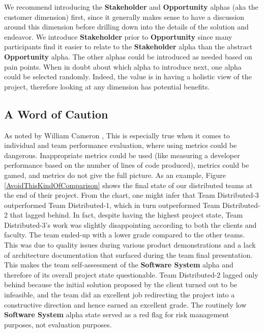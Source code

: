 We recommend introducing the \textbf{Stakeholder} and \textbf{Opportunity} alphas (aka the customer dimension) first, since it generally makes sense to have a discussion around this dimension before drilling down into the details of the solution and endeavor. We introduce \textbf{Stakeholder} prior to \textbf{Opportunity} since many participants find it easier to relate to the \textbf{Stakeholder} alpha than the abstract \textbf{Opportunity} alpha. The other alphas could be introduced as needed based on pain points. When in doubt about which alpha to introduce next, one alpha could be selected randomly. Indeed, the value is in having a holistic view of the project, therefore looking at any dimension has potential benefits.

\subsection{A Word of Caution}
As noted by William Cameron \cite{CameronSociologicalThinking},  This is especially true when it comes to individual and team performance evaluation, where using metrics could be dangerous. Inappropriate metrics could be used (like measuring a developer performance based on the number of lines of code produced), metrics could be gamed, and metrics do not give the full picture.
As an example, Figure \ref{AvoidThisKindOfComparison} shows the final state of our distributed teams at the end of their project. From the chart, one might infer that Team Distributed-3 outperformed Team Distributed-1, which in turn outperformed Team Distributed-2 that lagged behind. In fact, despite having the highest project state, Team Distributed-3's work was slightly disappointing according to both the clients and faculty. The team ended-up with a lower grade compared to the other teams. This was due to quality issues during various product demonstrations and a lack of architecture documentation that surfaced during the team final presentation. This makes the team self-assessment of the \textbf{Software System} alpha and therefore of its overall project state questionable. Team Distributed-2 lagged only behind because the initial solution proposed by the client turned out to be infeasible, and the team did an excellent job redirecting the project into a constructive direction and hence earned an excellent grade. The routinely low \textbf{Software System} alpha state served as a red flag for risk management purposes, not evaluation purposes.

